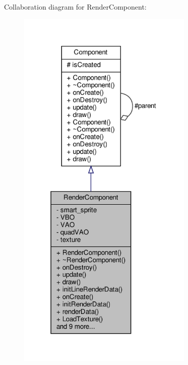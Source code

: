 Collaboration diagram for Render\+Component\+:
\nopagebreak
\begin{figure}[H]
\begin{center}
\leavevmode
\includegraphics[width=238pt]{classRenderComponent__coll__graph}
\end{center}
\end{figure}
